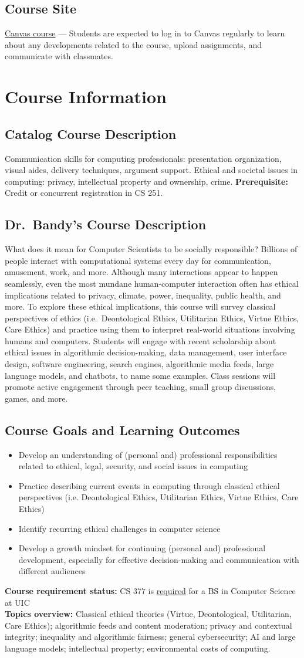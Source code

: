 \documentclass[11pt]{article}
\newcommand{\blackboardLinkText}{Canvas course}
\newcommand{\blackboardLinkUrl}{https://canvas.uic.edu}
\newcommand{\courseModalitySchedule}{%
\textbf{Course modality:} On campus \\
\textbf{Days/Times:} Mondays and Wednesdays \\
\textbf{Location/Link:} CDRLC 2411 \\
}
\newcommand{\catalogDescription}{%
Communication skills for computing professionals: presentation organization, visual
aides, delivery techniques, argument support. Ethical and societal issues in computing:
privacy, intellectual property and ownership, crime. \textbf{Prerequisite:} Credit or concurrent registration in CS 251.
}
\newcommand{\courseGoalsLearningOutcomes}{%
\begin{itemize}
  \item Develop an understanding of (personal and) professional responsibilities related to ethical, legal, security, and social issues in computing
  \item Practice describing current events in computing through classical ethical
perspectives (i.e. Deontological Ethics, Utilitarian Ethics, Virtue Ethics, Care Ethics)
  \item Identify recurring ethical challenges in computer science
  \item Develop a growth mindset for continuing (personal and) professional development, especially for effective decision-making and communication with different audiences
\end{itemize}

\textbf{Course requirement status:} CS 377 is \href{https://catalog.uic.edu/ucat/colleges-depts/engineering/cs/bs-cs/}{required} for a BS in Computer Science at UIC\\
\textbf{Topics overview:} Classical ethical theories (Virtue, Deontological, Utilitarian, Care Ethics); algorithmic feeds and content moderation; privacy and contextual integrity; inequality and algorithmic fairness; general cybersecurity; AI and large language models; intellectual property; environmental costs of computing.
}
\begin{document}
\vspace{0.8\baselineskip}

\subsection*{Course Site}

\href{\blackboardLinkUrl}{\blackboardLinkText} --- Students are expected to log in to Canvas regularly to learn about any developments related to the course, upload assignments, and communicate with classmates.


\section*{Course Information}

\subsection*{Catalog Course Description}
\catalogDescription

\subsection*{Dr.\ Bandy's Course Description}

What does it mean for Computer Scientists to be socially responsible? Billions of
people interact with computational systems every day for communication, amusement,
work, and more. Although many interactions appear to happen seamlessly, even the
most mundane human-computer interaction often has ethical implications related to
privacy, climate, power, inequality, public health, and more. To explore these ethical
implications, this course will survey classical perspectives of ethics (i.e.\ Deontological
Ethics, Utilitarian Ethics, Virtue Ethics, Care Ethics) and practice using them to interpret
real-world situations involving humans and computers. Students will engage with
recent scholarship about ethical issues in algorithmic decision-making, data
management, user interface design, software engineering, search engines, algorithmic
media feeds, large language models, and chatbots, to name some examples. Class
sessions will promote active engagement through peer teaching, small group
discussions, games, and more.


\subsection*{Course Goals and Learning Outcomes}
\courseGoalsLearningOutcomes
\end{document}
